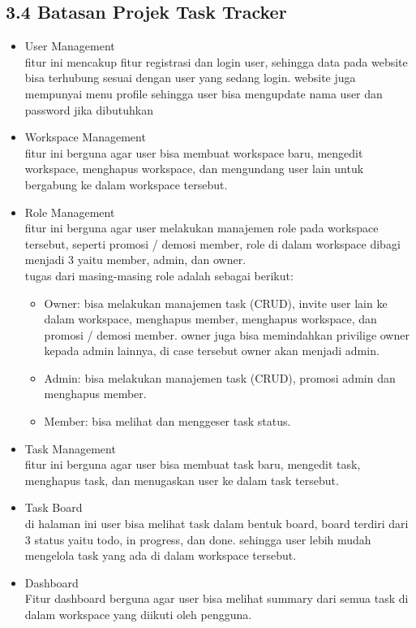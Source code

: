 \subsection*{3.4 Batasan Projek Task Tracker}
\begin{itemize}
    \item User Management \\
    fitur ini mencakup fitur registrasi dan login user, sehingga data pada website bisa terhubung sesuai dengan user yang sedang login.
    website juga mempunyai menu profile sehingga user bisa mengupdate nama user dan password jika dibutuhkan
    \item Workspace Management \\
    fitur ini berguna agar user bisa membuat workspace baru, mengedit workspace, menghapus workspace, dan mengundang user lain untuk bergabung ke dalam workspace tersebut.
    \item Role Management \\
    fitur ini berguna agar user melakukan manajemen role pada workspace tersebut, seperti promosi / demosi member, role di dalam workspace dibagi menjadi 3 yaitu member, admin, dan owner.
    \\ tugas dari masing-masing role adalah sebagai berikut:
    \begin{itemize}
      \item Owner: bisa melakukan manajemen task (CRUD), invite user lain ke dalam workspace, menghapus member, menghapus workspace, dan promosi / demosi member.
      owner juga bisa memindahkan privilige owner kepada admin lainnya, di case tersebut owner akan menjadi admin.
      \item Admin: bisa melakukan manajemen task (CRUD), promosi admin dan menghapus member.
      \item Member: bisa melihat dan menggeser task status.
    \end{itemize}
    \item Task Management \\
    fitur ini berguna agar user bisa membuat task baru, mengedit task, menghapus task, dan menugaskan user ke dalam task tersebut.
    \item Task Board \\
    di halaman ini user bisa melihat task dalam bentuk board, board terdiri dari 3 status yaitu todo, in progress, dan done. 
    sehingga user lebih mudah mengelola task yang ada di dalam workspace tersebut.
    \item Dashboard \\
    Fitur dashboard berguna agar user bisa melihat summary dari semua task di dalam workspace yang diikuti oleh pengguna.
\end{itemize}

